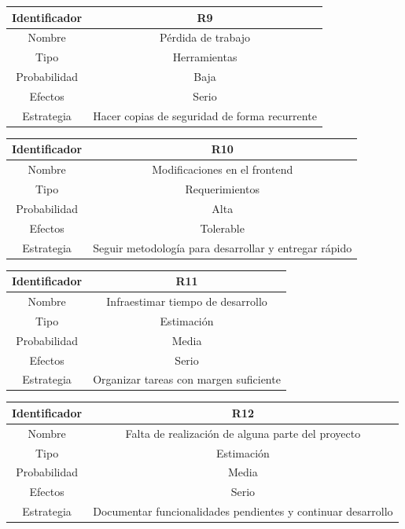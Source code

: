 \vspace{1em}
\par
\begin{tabular}{||c|c||} 
\hline
Identificador & R9 \\ [0.5ex] 
\hline\hline
Nombre & Pérdida de trabajo \\ 
\hline
Tipo & Herramientas \\
\hline
Probabilidad & Baja \\
\hline
Efectos & Serio \\
\hline
Estrategia & Hacer copias de seguridad de forma recurrente \\ [1ex] 
\hline
\end{tabular}

\vspace{1em}
\par
\begin{tabular}{||c|c||} 
\hline
Identificador & R10 \\ [0.5ex] 
\hline\hline
Nombre & Modificaciones en el frontend \\ 
\hline
Tipo & Requerimientos \\
\hline
Probabilidad & Alta \\
\hline
Efectos & Tolerable \\
\hline
Estrategia & Seguir metodología para desarrollar y entregar rápido \\ [1ex] 
\hline
\end{tabular}

\vspace{1em}
\par
\begin{tabular}{||c|c||} 
\hline
Identificador & R11 \\ [0.5ex] 
\hline\hline
Nombre & Infraestimar tiempo de desarrollo \\ 
\hline
Tipo & Estimación \\
\hline
Probabilidad & Media \\
\hline
Efectos & Serio \\
\hline
Estrategia & Organizar tareas con margen suficiente \\ [1ex] 
\hline
\end{tabular}

\vspace{1em}
\par
\begin{tabular}{||c|c||} 
\hline
Identificador & R12 \\ [0.5ex] 
\hline\hline
Nombre & Falta de realización de alguna parte del proyecto \\ 
\hline
Tipo & Estimación \\
\hline
Probabilidad & Media \\
\hline
Efectos & Serio \\
\hline
Estrategia & Documentar funcionalidades pendientes y continuar desarrollo \\ [1ex] 
\hline
\end{tabular}


